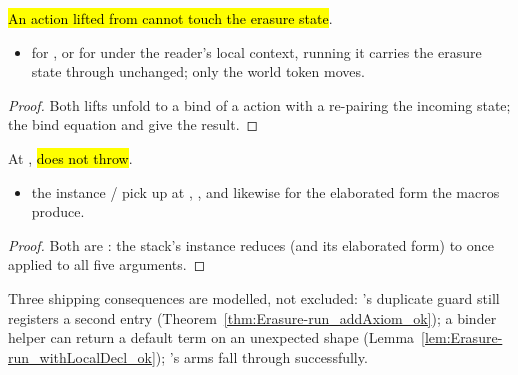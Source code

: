 \begin{lemma}
\label{lem:Erasure-run_liftCoreM_ok}
\leanok
{}
 \hl{An action lifted from  cannot touch the erasure state}.
\begin{itemize}
\item {}  for , or
 for  under the reader's local context, running it
carries the erasure state through unchanged; only the world token moves.
\end{itemize}
\end{lemma}
\begin{proof}
\leanok
{}
 Both lifts unfold to a bind of a  action with a  re-pairing the
incoming state; the bind equation and  give the result.
\end{proof}

\begin{lemma}
\label{lem:Erasure-run_panic}
\leanok
{}
 At , \hl{ does not throw}.
\begin{itemize}
\item {} the  instance / pick up at
, , and
likewise for the elaborated  form the macros produce.
\end{itemize}
\end{lemma}
\begin{proof}
\leanok
{} Both are : the stack's  instance reduces  (and its
elaborated form) to  once applied to all five arguments.
\end{proof}

\begin{remark}
 Three shipping consequences are modelled, not excluded: 's duplicate
guard still registers a second entry (Theorem~\ref{thm:Erasure-run_addAxiom_ok}); a binder helper can
return a default \lbox{} term on an unexpected shape (Lemma~\ref{lem:Erasure-run_withLocalDecl_ok});
's  arms fall through successfully.
\end{remark}

